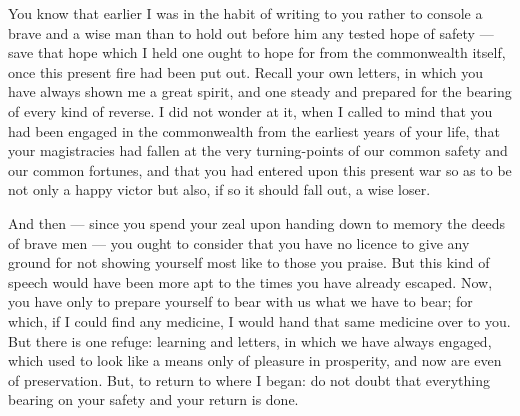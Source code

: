  You know that earlier I was in the habit of writing to you rather to console a brave and a wise man than to hold out before him any tested hope of safety --- save that hope which I held one ought to hope for from the commonwealth itself, once this present fire had been put out. Recall your own letters, in which you have always shown me a great spirit, and one steady and prepared for the bearing of every kind of reverse. I did not wonder at it, when I called to mind that you had been engaged in the commonwealth from the earliest years of your life, that your magistracies had fallen at the very turning-points of our common safety and our common fortunes, and that you had entered upon this present war so as to be not only a happy victor but also, if so it should fall out, a wise loser.

 And then --- since you spend your zeal upon handing down to memory the deeds of brave men --- you ought to consider that you have no licence to give any ground for not showing yourself most like to those you praise. But this kind of speech would have been more apt to the times you have already escaped. Now, you have only to prepare yourself to bear with us what we have to bear; for which, if I could find any medicine, I would hand that same medicine over to you. But there is one refuge: learning and letters, in which we have always engaged, which used to look like a means only of pleasure in prosperity, and now are even of preservation. But, to return to where I began: do not doubt that everything bearing on your safety and your return is done.
